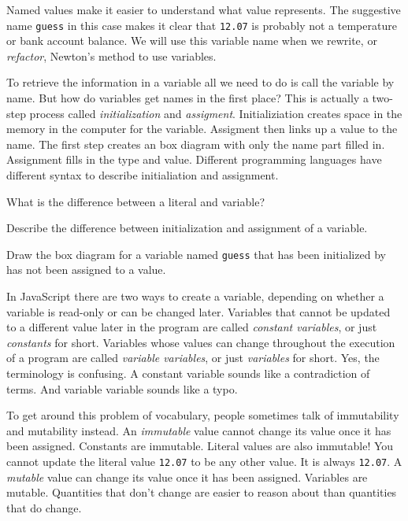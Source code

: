 Named values make it easier to understand what value represents. The suggestive name \texttt{guess} in this case makes it clear that \texttt{12.07} is probably not a temperature or bank account balance. We will use this variable name when we rewrite, or \emph{refactor}, Newton's method to use variables.

To retrieve the information in a variable all we need to do is call the variable by name. But how do variables get names in the first place? This is actually a two-step process called \emph{initialization} and \emph{assigment}. Initializiation creates space in the memory in the computer for the variable. Assigment then links up a value to the name. The first step creates an box diagram with only the name part filled in. Assignment fills in the type and value. Different programming languages have different syntax to describe initialiation and assignment.

\begin{question}
  What is the difference between a literal and variable?
\end{question}

\begin{question}
  Describe the difference between initialization and assignment of a variable.
\end{question}

\begin{question}
  Draw the box diagram for a variable named \texttt{guess} that has been initialized by has not been assigned to a value.
\end{question}

In JavaScript there are two ways to create a variable, depending on whether a variable is read-only or can be changed later. Variables that cannot be updated to a different value later in the program are called \emph{constant variables}, or just \emph{constants} for short. Variables whose values can change throughout the execution of a program are called \emph{variable variables}, or just \emph{variables} for short. Yes, the terminology is confusing. A constant variable sounds like a contradiction of terms. And variable variable sounds like a typo.

To get around this problem of vocabulary, people sometimes talk of immutability and mutability instead. An \emph{immutable} value cannot change its value once it has been assigned. Constants are immutable. Literal values are also immutable! You cannot update the literal value \texttt{12.07} to be any other value. It is always \texttt{12.07}. A \emph{mutable} value can change its value once it has been assigned. Variables are mutable. Quantities that don't change are easier to reason about than quantities that do change.

